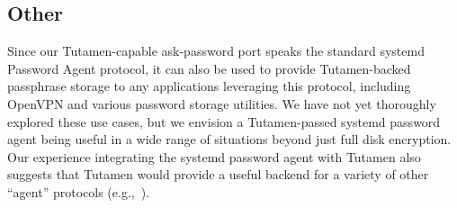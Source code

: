 \subsection{Other}

Since our Tutamen-capable ask-password port speaks the standard
systemd Password Agent protocol, it can also be used to provide
Tutamen-backed passphrase storage to any applications leveraging this
protocol, including OpenVPN and various password storage utilities. We
have not yet thoroughly explored these use cases, but we envision a
Tutamen-passed systemd password agent being useful in a wide range of
situations beyond just full disk encryption. Our experience
integrating the systemd password agent with Tutamen also suggests that
Tutamen would provide a useful backend for a variety of other
``agent'' protocols (e.g.,~\cite{cox2002, ylonen1996}).

